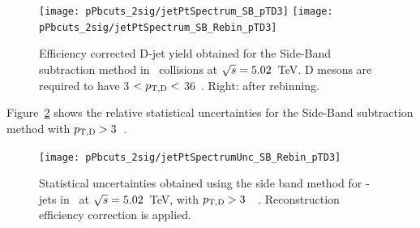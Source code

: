 \begin{figure}[bth]
\centering
\texttt{[image: pPbcuts\_2sig/jetPtSpectrum\_SB\_pTD3]}
\texttt{[image: pPbcuts\_2sig/jetPtSpectrum\_SB\_Rebin\_pTD3]}
\caption{Efficiency corrected D-jet yield obtained for the Side-Band subtraction method in \pp\ collisions at $\sqrt{s}=5.02$~TeV. D mesons are required to have 3 $< p_{\mathrm{T,D}}<$ 36~\GeVc. Right: after rebinning.}
\label{fig:eq_pPb_Directjet_corrSum}
\end{figure}


Figure~\ref{fig:JetPt_pPb_SBUnc_Dzero} shows the relative statistical uncertainties for the Side-Band subtraction method with $p_{\mathrm{T,D}}>3$~\GeVc. %

\begin{figure}[bth]
\centering
\texttt{[image: pPbcuts\_2sig/jetPtSpectrumUnc\_SB\_Rebin\_pTD3]}
\caption{Statistical uncertainties obtained using the side band method for \Dzero-jets in \pp\ at $\sqrt{s}=5.02$~TeV, with $p_{\mathrm{T,D}}>3$~\GeVc\ . Reconstruction efficiency correction is applied.}
\label{fig:JetPt_pPb_SBUnc_Dzero}
\end{figure}


